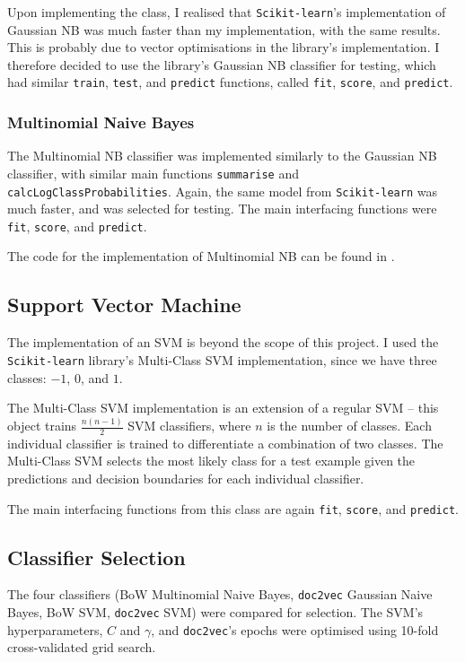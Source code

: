 \documentclass[12pt,a4paper,twoside,openright]{report}
\begin{document}
Upon implementing the class, I realised that \texttt{Scikit-learn}'s implementation
of Gaussian NB was much faster than my implementation, with the same results. This is probably
due to vector optimisations in the library's implementation. I therefore decided
to use the library's Gaussian NB classifier for testing, which had similar \texttt{train}, \texttt{test}, and \texttt{predict}
functions, called \texttt{fit}, \texttt{score}, and \texttt{predict}.

\subsubsection{Multinomial Naive Bayes}
\label{sec:impMNB}

The Multinomial NB classifier was implemented similarly to the Gaussian NB classifier, with similar
main functions \texttt{summarise} and \texttt{calcLogClassProbabilities}. Again, the same model
from \texttt{Scikit-learn} was much faster, and was selected for testing.
The main interfacing functions were \texttt{fit}, \texttt{score}, and \texttt{predict}.

The code for the implementation of Multinomial NB can be found in .

\subsection{Support Vector Machine}
\label{sec:impSVM}

The implementation of an SVM is beyond the scope of this project.
I used the \texttt{Scikit-learn} library's Multi-Class SVM implementation,
since we have three classes: $-1$, $0$, and $1$.

The Multi-Class SVM implementation is an extension of a regular SVM --
this object trains $\frac{n (n-1)}{2}$ SVM classifiers, where $n$ is the number
of classes. Each individual classifier is trained to differentiate a combination
of two classes. The Multi-Class SVM selects the most likely class for a test example 
given the predictions and decision boundaries for each individual classifier.

The main interfacing functions from this class are again \texttt{fit}, \texttt{score},
and \texttt{predict}.

\subsection{Classifier Selection}
\label{sec:classSelect}
The four classifiers (BoW Multinomial Naive Bayes, \texttt{doc2vec} Gaussian Naive Bayes, BoW SVM, \texttt{doc2vec} SVM)
were compared for selection. The SVM's hyperparameters, $C$ and $\gamma$, and \texttt{doc2vec}'s epochs were
optimised using 10-fold
cross-validated grid search.
\end{document}

